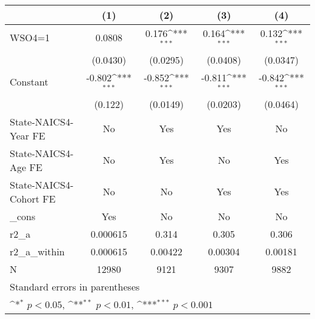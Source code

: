 {
\def\sym#1{\ifmmode^{#1}\else\(^{#1}\)\fi}
\begin{tabular}{l*{4}{c}}
\hline\hline
                    &\multicolumn{1}{c}{(1)}         &\multicolumn{1}{c}{(2)}         &\multicolumn{1}{c}{(3)}         &\multicolumn{1}{c}{(4)}         \\
\hline
WSO4=1              &      0.0808         &       0.176\sym{***}&       0.164\sym{***}&       0.132\sym{***}\\
                    &    (0.0430)         &    (0.0295)         &    (0.0408)         &    (0.0347)         \\
[1em]
Constant            &      -0.802\sym{***}&      -0.852\sym{***}&      -0.811\sym{***}&      -0.842\sym{***}\\
                    &     (0.122)         &    (0.0149)         &    (0.0203)         &    (0.0464)         \\
[1em]
State-NAICS4-Year FE&          No         &         Yes         &         Yes         &          No         \\
[1em]
State-NAICS4-Age FE &          No         &         Yes         &          No         &         Yes         \\
[1em]
State-NAICS4-Cohort FE&          No         &          No         &         Yes         &         Yes         \\
[1em]
\_cons              &         Yes         &          No         &          No         &          No         \\
\hline
r2\_a                &    0.000615         &       0.314         &       0.305         &       0.306         \\
r2\_a\_within         &    0.000615         &     0.00422         &     0.00304         &     0.00181         \\
N                   &       12980         &        9121         &        9307         &        9882         \\
\hline\hline
\multicolumn{5}{l}{\footnotesize Standard errors in parentheses}\\
\multicolumn{5}{l}{\footnotesize \sym{*} \(p<0.05\), \sym{**} \(p<0.01\), \sym{***} \(p<0.001\)}\\
\end{tabular}
}

